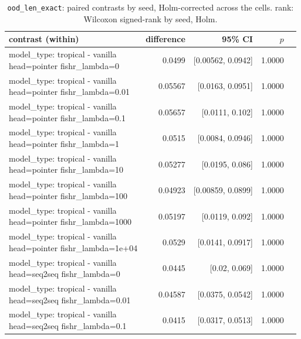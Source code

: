 \documentclass[10pt]{article}
\makeatletter
\newcommand{\stackcell}[1]{\begin{tabular}[t]{@{}l@{}}#1\end{tabular}}
\makeatother
\begin{document}
{\small
\begin{longtable}{lrrrl}
\caption{\texttt{ood\_len\_exact}: paired contrasts by seed, Holm-corrected across the cells. rank: Wilcoxon signed-rank by seed, Holm.}\label{tab:paired-ood_len_exact}\\
\toprule
contrast (within) & difference & 95\% CI & $p$ & \\
\midrule
\endhead
\stackcell{model\_type: tropical - vanilla\\\footnotesize head=pointer fishr\_lambda=0 } & 0.0499 & [0.00562, 0.0942] & 1.0000 & \\
\stackcell{model\_type: tropical - vanilla\\\footnotesize head=pointer fishr\_lambda=0.01 } & 0.05567 & [0.0163, 0.0951] & 1.0000 & \\
\stackcell{model\_type: tropical - vanilla\\\footnotesize head=pointer fishr\_lambda=0.1 } & 0.05657 & [0.0111, 0.102] & 1.0000 & \\
\stackcell{model\_type: tropical - vanilla\\\footnotesize head=pointer fishr\_lambda=1 } & 0.0515 & [0.0084, 0.0946] & 1.0000 & \\
\stackcell{model\_type: tropical - vanilla\\\footnotesize head=pointer fishr\_lambda=10 } & 0.05277 & [0.0195, 0.086] & 1.0000 & \\
\stackcell{model\_type: tropical - vanilla\\\footnotesize head=pointer fishr\_lambda=100 } & 0.04923 & [0.00859, 0.0899] & 1.0000 & \\
\stackcell{model\_type: tropical - vanilla\\\footnotesize head=pointer fishr\_lambda=1000 } & 0.05197 & [0.0119, 0.092] & 1.0000 & \\
\stackcell{model\_type: tropical - vanilla\\\footnotesize head=pointer fishr\_lambda=1e+04 } & 0.0529 & [0.0141, 0.0917] & 1.0000 & \\
\stackcell{model\_type: tropical - vanilla\\\footnotesize head=seq2seq fishr\_lambda=0 } & 0.0445 & [0.02, 0.069] & 1.0000 & \\
\stackcell{model\_type: tropical - vanilla\\\footnotesize head=seq2seq fishr\_lambda=0.01 } & 0.04587 & [0.0375, 0.0542] & 1.0000 & \\
\stackcell{model\_type: tropical - vanilla\\\footnotesize head=seq2seq fishr\_lambda=0.1 } & 0.0415 & [0.0317, 0.0513] & 1.0000 & \\

\end{longtable}}
\end{document}
